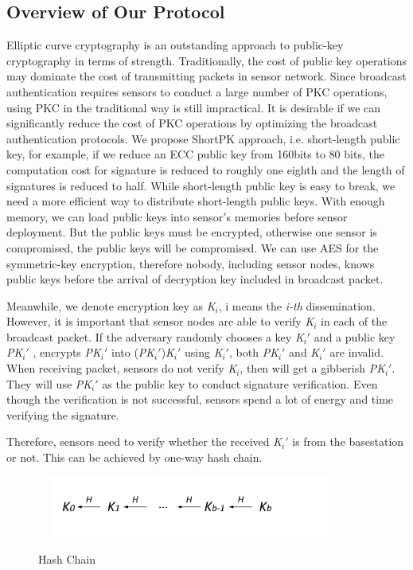\documentclass{sig-alternate-05-2015}
\begin{document}
\subsection{Overview of Our Protocol}
Elliptic curve cryptography is an outstanding approach to public-key cryptography in terms of strength. Traditionally, the cost of public key operations may dominate the cost of transmitting packets in sensor network. Since broadcast authentication requires sensors to conduct a large number of PKC operations, using PKC in the traditional way is still impractical. It is desirable if we can significantly reduce the cost of PKC operations by optimizing the broadcast authentication protocols.
We propose ShortPK approach, i.e. short-length public key, for example, if we reduce an ECC public key from 160bits to 80 bits, the computation cost for signature is reduced to roughly one eighth and the length of signatures is reduced to half. While short-length public key is easy to break, we need a more efficient way to distribute short-length public keys. With enough memory, we can load public keys into sensor$'$s memories before sensor deployment. But the public keys must be encrypted, otherwise one sensor is compromised, the public keys will be compromised.  We can use AES for the symmetric-key encryption, therefore nobody, including sensor nodes, knows public keys before the arrival of decryption key included in broadcast packet. 

Meanwhile, we denote encryption key as \emph{K$_i$}, i means the \emph{i-th} dissemination. However, it is important that sensor nodes are able to verify \emph{K$_i$} in each of the broadcast packet. If the adversary randomly chooses a key \emph{K$_i '$} and a public key \emph{PK$_i '$} , encrypts \emph{PK$_i '$} into (\emph{PK$_i '$})\emph{K$_i '$} using \emph{K$_i '$}, both \emph{PK$_i '$} and \emph{K$_i '$} are invalid. When receiving packet, sensors do not verify \emph{K$_i$}, then will get a gibberish \emph{PK$_i '$}. They will use \emph{PK$_i '$} as the public key to conduct signature verification. Even though the verification is not successful, sensors spend a lot of energy and time verifying the signature.

Therefore, sensors need to verify whether the received \emph{K$_i '$} is from the basestation or not. This can be achieved by one-way hash chain.

\begin{figure}
\centering
\includegraphics[width=10cm,height=2cm]{HashChain.pdf}\\
\caption{Hash Chain}\label{} 
\end{figure}
\end{document}
